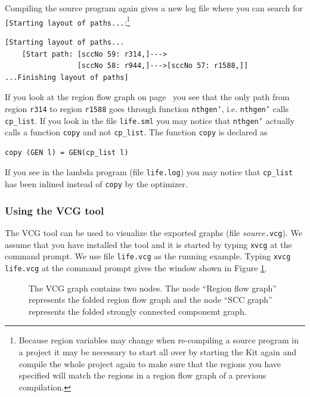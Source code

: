 \documentclass[12pt]{book}
\begin{document}
Compiling the source program again gives a new log file where you can
search for \texttt{[Starting layout of paths...}:\footnote{Because region
  variables may change when re-compiling a source program in a project it
  may be necessary to start all over by starting the Kit again and compile
  the whole project again to make sure that the regions you have specified
  will match the regions in a region flow graph of a previous compilation.}

\begin{verbatim}
[Starting layout of paths...
    [Start path: [sccNo 59: r314,]--->
                 [sccNo 58: r944,]--->[sccNo 57: r1588,]]
...Finishing layout of paths]
\end{verbatim}
\noindent
If you look at the region flow graph on
page~\pageref{reg_flow_graph.ex} you see that the only path from
region \texttt{r314} to region \texttt{r1588} goes through function
\texttt{nthgen'}, i.e. \texttt{nthgen'} calls \texttt{cp\_list}. If
you look in the file \texttt{life.sml} you may notice that
\texttt{nthgen'} actually calls a function \texttt{copy} and not
\texttt{cp\_list}. The function \texttt{copy} is declared as

\begin{verbatim}
copy (GEN l) = GEN(cp_list l)
\end{verbatim}
\noindent
If you see in the lambda program (file \texttt{life.log}) you may notice
that \texttt{cp\_list} has been inlined instead of \texttt{copy} by the
optimizer.

\subsubsection{Using the VCG tool}

The VCG tool
%
can be used to visualize the exported graphs (file
\emph{source}\texttt{.vcg}). We assume that you have installed the
tool and it is started by typing \texttt{xvcg} at the command prompt.
We use file \texttt{life.vcg} as the running example. Typing
\mbox{\texttt{xvcg life.vcg}} at the command prompt gives the window
shown in Figure \ref{vcg1.fig}.

\begin{figure}[htb]
\begin{center}
  \caption{The VCG graph contains two nodes. The
    node ``Region flow graph'' represents the folded region flow graph and
    the node ``SCC graph'' represents the folded strongly connected
    componemt graph.}\label{vcg1.fig}
\end{center}
\end{figure}
\end{document}
